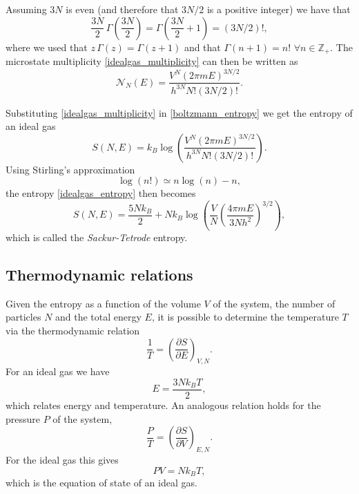 \documentclass[12pt]{article}
\numberwithin{equation}{section} %
\begin{document}
Assuming $3N$ is even (and therefore that $3N/2$ is a positive integer) we have that
\begin{equation}
\frac{3N}{2}\,\Gamma\left( \frac{3N}{2} \right) = \Gamma\left( \frac{3N}{2}+1\right) = \left( 3N/2\right)!,
\end{equation}
where we used that $z\,\Gamma(z)=\Gamma(z+1)$ and that $\Gamma(n+1) = n!\,\,\forall n\in \mathbb{Z}_+$. The microstate multiplicity \eqref{idealgas_multiplicity} can then be written as
\begin{equation}
\mathcal{N}_N(E) = \frac{V^N (2\pi m E)^{3N/2}}{h^{3N}N!\left(3N/2\right)!}.
\end{equation}

Substituting \eqref{idealgas_multiplicity} in \eqref{boltzmann_entropy} we get the entropy of an ideal gas
\begin{equation}
\label{idealgas_entropy}
S(N, E) = k_B\log\left( \frac{V^N (2\pi m E)^{3N/2}}{h^{3N}N!\left(3N/2\right)!} \right).
\end{equation}
Using Stirling's approximation
\begin{equation}
\log(n!) \simeq n\log(n)-n,
\end{equation}
the entropy \eqref{idealgas_entropy} then becomes
\begin{equation}
S(N, E) = \frac{5 N k_B}{2} + N k_B\log\left( \frac{V}{N} \left(\frac{4\pi m E }{3 N h^2} \right)^{3/2} \right),
\end{equation}
which is called the \textit{Sackur-Tetrode} entropy.

\subsection{Thermodynamic relations}
Given the entropy as a function of the volume $V$ of the system, the number of particles $N$ and the total energy $E$, it is possible to determine the temperature $T$ via the thermodynamic relation
\begin{equation}
\frac{1}{T} = \left( \frac{\partial S}{\partial E}\right)_{V,N}.
\end{equation}
For an ideal gas we have
\begin{equation}
E = \frac{3 N k_B T}{2},
\end{equation}
which relates energy and temperature. An analogous relation holds for the pressure $P$ of the system,
\begin{equation}
\frac{P}{T} = \left( \frac{\partial S}{\partial V}\right)_{E,N}.
\end{equation}
For the ideal gas this gives
\begin{equation}
P V = N k_B T,
\end{equation}
which is the equation of state of an ideal gas.
\end{document}
